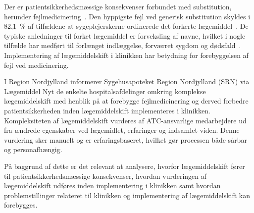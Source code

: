 Der er patientsikkerhedsmæssige konsekvenser forbundet med substitution, herunder fejlmedicinering~\citep{Hakonsen2010}. Den hyppigste fejl ved generisk substitution skyldes i 82,1~\% af tilfældene at sygeplejerskerne ordinerede det forkerte lægemiddel~\citep{Hakonsen2010}. De typiske anledninger til forket lægemiddel er forveksling af navne, hvilket i nogle tilfælde har medført til forlænget indlæggelse, forværret sygdom og dødsfald~\citep{DanskSelskabforPatientsikkerhed2009}. Implementering af lægemiddelskift i klinikken har betydning for forebyggelsen af fejl ved medicinering.

I Region Nordjylland informerer Sygehusapoteket Region Nordjylland (SRN) via Lægemiddel Nyt de enkelte hospitalsafdelinger omkring komplekse lægemiddelskift med henblik på at forebygge fejlmedicinering og derved forbedre patientsikkerheden inden lægemiddelskift implementeres i klinikken. Kompleksiteten af lægemiddelskift vurderes af ATC-ansvarlige medarbejdere ud fra ændrede egenskaber ved lægemidlet, erfaringer og indsamlet viden. Denne vurdering sker manuelt og er erfaringsbaseret, hvilket gør processen både sårbar og personafhængig.

På baggrund af dette er det relevant at analysere, hvorfor  lægemiddelskift fører til patientsikkerhedsmæssige konsekvenser, hvordan vurderingen af lægemiddelskift udføres inden implementering i klinikken samt hvordan problemstillinger relateret til klinikken og implementering af lægemiddelskift kan forebygges. 
